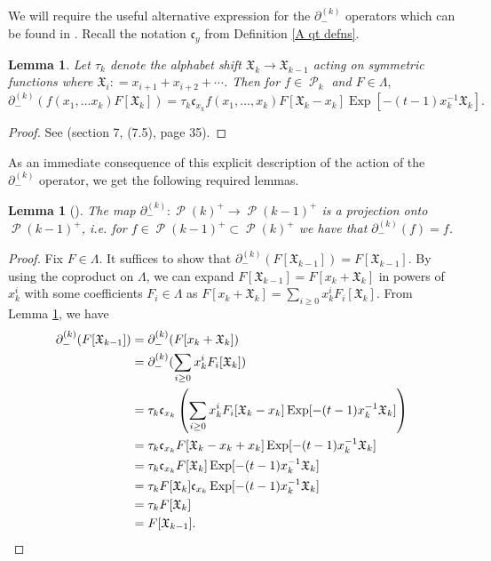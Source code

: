 \documentclass[11pt]{article}
\newtheorem{lemm}[theo]{Lemma}
\theoremstyle{definition}
\numberwithin{equation}{section}
\DeclareMathOperator{\sP}{\mathscr{P} }
\DeclareMathOperator{\EXP}{\mathrm{Exp}}
\begin{document}
We will require the useful alternative expression for the $\partial_{-}^{(k)}$ operators which can be found in \cite{Ion_2022}. Recall the notation $\mathfrak{c}_{y}$ from Definition \ref{A qt defns}.

\begin{lemm}\label{lowering operator alternative description}
Let $\tau_k$ denote the alphabet shift $\mathfrak{X}_k \rightarrow \mathfrak{X}_{k-1}$ acting on symmetric functions where $\mathfrak{X}_i : = x_{i+1}+x_{i+2}+ \cdots$. Then for $f \in \sP_{k}$ and $F \in \Lambda,$
$$ \partial_{-}^{(k)}(f(x_1,\ldots x_k) F[\mathfrak{X}_k]) = \tau_k \mathfrak{c}_{x_k} f(x_1,\ldots,x_k)F[\mathfrak{X}_k -x_k]\EXP[-(t-1)x_k^{-1}\mathfrak{X}_{k}].$$
\end{lemm}

\begin{proof}
See \cite{Ion_2022} (section 7, (7.5), page 35).
\end{proof}

As an immediate consequence of this explicit description of the action of the $\partial_{-}^{(k)}$ operator, we get the following required lemmas.

\begin{lemm}[{\cite[Section 7, (7.6), page 35]{Ion_2022}}] \label{lowering is a projection}
The map $\partial_{-}^{(k)}: \sP(k)^{+} \rightarrow \sP(k-1)^{+}$ is a projection onto $\sP(k-1)^{+}$, i.e. for $f \in \sP(k-1)^{+}\subset \sP(k)^{+}$ we have that $\partial_{-}^{(k)}(f) = f$.
\end{lemm}
\begin{proof}
    Fix $F \in \Lambda.$ It suffices to show that $\partial_{-}^{(k)}(F[\mathfrak{X}_{k-1}]) = F[\mathfrak{X}_{k-1}].$ By using the coproduct on $\Lambda$, we can expand $F[\mathfrak{X}_{k-1}] = F[x_k+\mathfrak{X}_{k}]$ in powers of $x_k^{i}$ with some coefficients $F_i \in \Lambda$ as $F[x_k+\mathfrak{X}_{k}] = \sum_{i \geq 0} x_k^{i}F_{i}[\mathfrak{X}_{k}].$ From Lemma \ref{lowering operator alternative description}, we have 
    \begin{align*}
        \partial_{-}^{(k)}(F[\mathfrak{X}_{k-1}]) &= \partial_{-}^{(k)}(F[x_{k}+\mathfrak{X}_{k}])\\
        &= \partial_{-}^{(k)}(\sum_{i \geq 0} x_k^{i}F_{i}[\mathfrak{X}_{k}]) \\
        &= \tau_k \mathfrak{c}_{x_k} \left( \sum_{i \geq 0} x_k^{i}F_i[\mathfrak{X}_k -x_k]\EXP[-(t-1)x_k^{-1}\mathfrak{X}_{k}] \right) \\
        &= \tau_k \mathfrak{c}_{x_k} F[\mathfrak{X}_k -x_k +x_k]\EXP[-(t-1)x_k^{-1}\mathfrak{X}_{k}] \\
        &= \tau_k \mathfrak{c}_{x_k} F[\mathfrak{X}_k] \EXP[-(t-1)x_k^{-1}\mathfrak{X}_{k}] \\ 
        &= \tau_k F[\mathfrak{X}_k] \mathfrak{c}_{x_k} \EXP[-(t-1)x_k^{-1}\mathfrak{X}_{k}] \\ 
        &= \tau_k F[\mathfrak{X}_k] \\
        &= F[\mathfrak{X}_{k-1}]. \qedhere
    \end{align*}
    
    
\end{proof}
\end{document}
